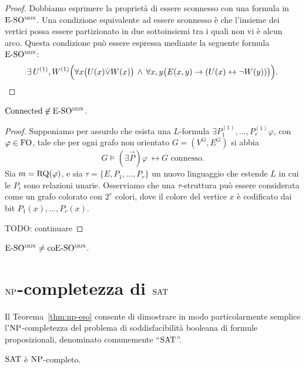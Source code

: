 \begin{proof}
  Dobbiamo esprimere la proprietà di essere sconnesso con una formula in $\operatorname{E-SO^{\normalfont\textsc{mon}}}$.
  Una condizione equivalente ad essere sconnesso è che l'insieme dei vertici possa essere partizionato in due sottoinsiemi tra i quali non vi è alcun arco. Questa condizione può essere espressa mediante la seguente formula $\operatorname{E-SO^{\normalfont\textsc{mon}}}$:
  \[ \exists \, U^{(1)}, W^{(1)} \Big( \forall x \big( U(x) \dot\lor W(x) \big) \,\wedge\, \forall x,y \big( E(x,y) \rightarrow (U(x) \leftrightarrow \lnot W(y))\big) \Big). \qedhere \]
\end{proof}


\begin{lemma}
  $\operatorname{Connected} \not\in \operatorname{E-SO^{\normalfont\textsc{mon}}}$.
\end{lemma}

\begin{proof}
  Supponiamo per assurdo che esista una $L$-formula $\exists P_1^{(1)},\ldots,P_r^{(1)} \varphi$, con $\varphi\in \operatorname{FO}$, tale che per ogni grafo non orientato $G=(V^G, E^G)$ si abbia
  \[ G \models (\exists \vec{P}) \varphi \, \leftrightarrow G \text{ connesso}. \]
  Sia $m=\operatorname{RQ}(\varphi)$, e sia $\tau = \{E,P_1,\ldots,P_r\}$ un nuovo linguaggio che estende $L$ in cui le $P_i$ sono relazioni unarie.
  Osserviamo che una $\tau$-struttura può essere considerata come un grafo colorato con $2^r$ colori, dove il colore del vertice $x$ è codificato dai bit $P_1(x),\ldots,P_r(x)$.
  
  TODO: continuare
\end{proof}



\begin{teorema}
  $\operatorname{E-SO^{\normalfont\textsc{mon}}} \neq \operatorname{coE-SO^{\normalfont\textsc{mon}}}$.
\end{teorema}




\section{$\operatorname{NP}$-completezza di $\operatorname{SAT}$}

Il Teorema~\ref{thm:np-eso} consente di dimostrare in modo particolarmente semplice l'$\operatorname{NP}$-com\-ple\-tez\-za del problema di soddisfacibilità booleana di formule proposizionali, denominato comunemente ``$\operatorname{SAT}$''.

\begin{teorema}
  $\operatorname{SAT}$ è $\operatorname{NP}$-completo.
\end{teorema}

